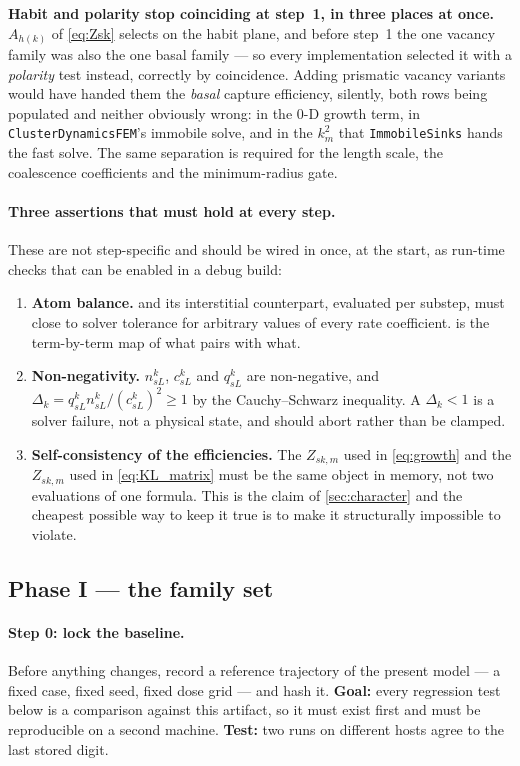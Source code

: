 \documentclass{article}
\newcommand{\code}[1]{\texttt{#1}}
\begin{document}
\textbf{Habit and polarity stop coinciding at step~1, in three places at once.}
$A_{h(k)}$ of \cref{eq:Zsk} selects on the habit plane, and before step~1 the one
vacancy family was also the one basal family --- so every implementation selected
it with a \emph{polarity} test instead, correctly by coincidence. Adding
prismatic vacancy variants would have handed them the \emph{basal} capture
efficiency, silently, both rows being populated and neither obviously wrong: in
the $0$-D growth term, in \code{ClusterDynamicsFEM}'s immobile solve, and in the
$k^2_m$ that \code{ImmobileSinks} hands the fast solve. The same separation is
required for the length scale, the coalescence coefficients and the
minimum-radius gate.

\paragraph{Three assertions that must hold at every step.} These are not
step-specific and should be wired in once, at the start, as run-time checks that
can be enabled in a debug build:
\begin{enumerate}[nosep]
\item \textbf{Atom balance.}  and its interstitial
      counterpart, evaluated per substep, must close to solver tolerance for
      arbitrary values of every rate coefficient.  is the
      term-by-term map of what pairs with what.
\item \textbf{Non-negativity.} $n^k_{sL}$, $c^k_{sL}$ and $q^k_{sL}$ are
      non-negative, and $\Delta_k=q^k_{sL}n^k_{sL}/(c^k_{sL})^2\ge1$ by the
      Cauchy--Schwarz inequality. A $\Delta_k<1$ is a solver failure, not a
      physical state, and should abort rather than be clamped.
\item \textbf{Self-consistency of the efficiencies.} The $Z_{sk,m}$ used in
      \cref{eq:growth} and the $Z_{sk,m}$ used in \cref{eq:KL_matrix} must be the
      same object in memory, not two evaluations of one formula. This is the
      claim of \cref{sec:character} and the cheapest possible way to keep it true
      is to make it structurally impossible to violate.
\end{enumerate}

\subsection{Phase I --- the family set}

\paragraph{Step 0: lock the baseline.} Before anything changes, record a
reference trajectory of the present model --- a fixed case, fixed seed, fixed
dose grid --- and hash it. \textbf{Goal:} every regression test below is a
comparison against this artifact, so it must exist first and must be
reproducible on a second machine. \textbf{Test:} two runs on different hosts
agree to the last stored digit.
\end{document}
